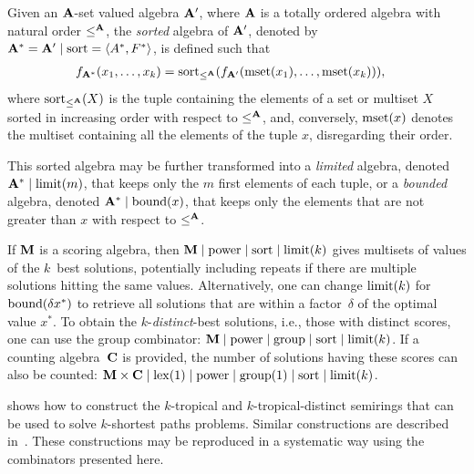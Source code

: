 \begin{definition}
    Given an \(\mathbf{A}\)-set valued algebra \(\mathbf{A}'\),
    where \(\mathbf{A}\) is a totally ordered algebra with natural order \(\le^{\mathbf{A}}\),
    the \emph{sorted} algebra of \(\mathbf{A}'\), denoted by \(\mathbf{A}^* = \mathbf{A}' \mid \mathrm{sort} = \left\langle A^*, F^*\right\rangle\), is defined such that
    \begin{align*}
        f_{\mathbf{A}^*}(x_1, \ldots, x_k) &= \operatorname{sort}_{\le^{\mathbf{A}}}(f_{\mathbf{A}'}(\operatorname{mset}(x_1), \ldots, \operatorname{mset}(x_k))),
    \end{align*}
    where \(\operatorname{sort}_{\le^{\mathbf{A}}}(X)\) is the tuple containing the elements of a set or multiset \(X\) sorted in increasing order with respect to \(\le^{\mathbf{A}}\),
    and, conversely, \(\operatorname{mset}(x)\) denotes the multiset containing all the elements of the tuple \(x\), disregarding their order.

    This sorted algebra may be further transformed into a \emph{limited} algebra, denoted \(\mathbf{A}^* \mid \mathrm{limit}(m)\), that keeps only the \(m\) first elements of each tuple, or a \emph{bounded} algebra, denoted \(\mathbf{A}^* \mid \mathrm{bound}(x)\), that keeps only the elements that are not greater than \(x\) with respect to \(\le^{\mathbf{A}}\).
\end{definition}

\begin{example}
    If \(\mathbf{M}\) is a scoring algebra, then \(\mathbf{M} \mid \mathrm{power} \mid \mathrm{sort} \mid \mathrm{limit}(k)\) gives multisets of values of the \(k\)~best solutions, potentially including repeats if there are multiple solutions hitting the same values.
    Alternatively, one can change \(\mathrm{limit}(k)\) for \(\mathrm{bound}(\delta x^*)\) to retrieve all solutions that are within a factor~\(\delta\) of the optimal value \(x^*\).
    To obtain the \(k\)-\emph{distinct}-best solutions, i.e., those with distinct scores, one can use the group combinator:
    \(\mathbf{M} \mid \mathrm{power} \mid \mathrm{group} \mid \mathrm{sort} \mid \mathrm{limit}(k)\).
    If a counting algebra~\(\mathbf{C}\) is provided, the number of solutions having these scores can also be counted:
    \(\mathbf{M} \times \mathbf{C} \mid \mathrm{lex}(1) \mid \mathrm{power} \mid \mathrm{group}(1) \mid \mathrm{sort} \mid \mathrm{limit}(k)\).
\end{example}

\textcite[§6]{Mohri2002SemiringFrameworksAlgorithms} shows how to construct the \(k\)-tropical and \(k\)-tropical-distinct semirings that can be used to solve \(k\)-shortest paths problems.
Similar constructions are described in~\textcite{Huang2008AdvancedDynamicProgramming,Sauthoff2013BellmansGapLanguage}.
These constructions may be reproduced in a systematic way using the combinators presented here.

